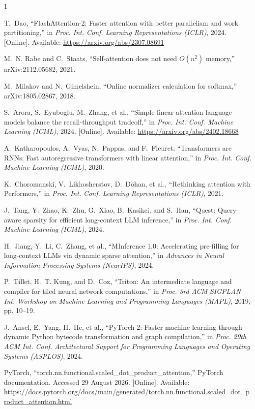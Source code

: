 \documentclass[10pt,conference,compsoc]{IEEEtran}
\begin{document}
\newpage
\begin{thebibliography}{1}

T.~Dao, ``FlashAttention-2: Faster attention with better parallelism and work partitioning,'' in \emph{Proc. Int. Conf. Learning Representations (ICLR)}, 2024. [Online]. Available: \url{https://arxiv.org/abs/2307.08691}

M.~N. Rabe and C.~Staats, ``Self-attention does not need $O(n^2)$ memory,'' arXiv:2112.05682, 2021.

M.~Milakov and N.~Gimelshein, ``Online normalizer calculation for softmax,'' arXiv:1805.02867, 2018.

S.~Arora, S.~Eyuboglu, M.~Zhang, et al., ``Simple linear attention language models balance the recall-throughput tradeoff,'' in \emph{Proc. Int. Conf. Machine Learning (ICML)}, 2024. [Online]. Available: \url{https://arxiv.org/abs/2402.18668}

A.~Katharopoulos, A.~Vyas, N.~Pappas, and F.~Fleuret, ``Transformers are RNNs: Fast autoregressive transformers with linear attention,'' in \emph{Proc. Int. Conf. Machine Learning (ICML)}, 2020.

K.~Choromanski, V.~Likhosherstov, D.~Dohan, et al., ``Rethinking attention with Performers,'' in \emph{Proc. Int. Conf. Learning Representations (ICLR)}, 2021.

J.~Tang, Y.~Zhao, K.~Zhu, G.~Xiao, B.~Kasikci, and S.~Han, ``Quest: Query-aware sparsity for efficient long-context LLM inference,'' in \emph{Proc. Int. Conf. Machine Learning (ICML)}, 2024.

H.~Jiang, Y.~Li, C.~Zhang, et al., ``MInference 1.0: Accelerating pre-filling for long-context LLMs via dynamic sparse attention,'' in \emph{Advances in Neural Information Processing Systems (NeurIPS)}, 2024.

P.~Tillet, H.~T. Kung, and D.~Cox, ``Triton: An intermediate language and compiler for tiled neural network computations,'' in \emph{Proc. 3rd ACM SIGPLAN Int. Workshop on Machine Learning and Programming Languages (MAPL)}, 2019, pp. 10--19.

J.~Ansel, E.~Yang, H.~He, et al., ``PyTorch 2: Faster machine learning through dynamic Python bytecode transformation and graph compilation,'' in \emph{Proc. 29th ACM Int. Conf. Architectural Support for Programming Languages and Operating Systems (ASPLOS)}, 2024.

PyTorch, ``torch.nn.functional.scaled\_dot\_product\_attention,'' PyTorch documentation. Accessed 29 August 2026. [Online]. Available: \url{https://docs.pytorch.org/docs/main/generated/torch.nn.functional.scaled_dot_product_attention.html}

\end{thebibliography}
\end{document}
